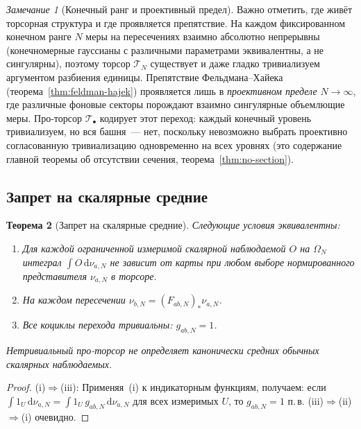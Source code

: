 \documentclass[12pt,a4paper]{article}
\theoremstyle{plain}
\newtheorem{theorem}{Теорема}[section]
\theoremstyle{definition}
\theoremstyle{remark}
\newtheorem{remark}[theorem]{Замечание}
\newcommand{\dd}{\mathrm{d}}
\begin{document}
\begin{remark}[Конечный ранг и проективный предел]
\label{rem:finite-vs-limit}
Важно отметить, где живёт торсорная структура и где
проявляется препятствие.  На каждом фиксированном конечном
ранге $N$ меры на пересечениях взаимно абсолютно непрерывны
(конечномерные гауссианы с различными параметрами
эквивалентны, а не сингулярны), поэтому торсор $\mathcal{T}_N$
существует и даже гладко тривиализуем аргументом разбиения
единицы.  Препятствие Фельдмана--Хайека
(теорема~\ref{thm:feldman-hajek}) проявляется лишь
в \emph{проективном пределе} $N \to \infty$, где различные
фоновые секторы порождают взаимно сингулярные объемлющие
меры.  Про-торсор $\mathcal{T}_\bullet$ кодирует этот
переход: каждый конечный уровень тривиализуем, но вся башня~---
нет, поскольку невозможно выбрать проективно согласованную
тривиализацию одновременно на всех уровнях (это содержание
главной теоремы об отсутствии сечения, теорема~\ref{thm:no-section}).
\end{remark}

\subsection{Запрет на скалярные средние}

\begin{theorem}[Запрет на скалярные средние]
\label{thm:scalar-nogo}
Следующие условия эквивалентны:
\begin{enumerate}[label=\textup{(\roman*)},leftmargin=2.5em]
  \item Для каждой ограниченной измеримой скалярной наблюдаемой $O$
    на $\Omega_N$ интеграл $\int O\,\dd\nu_{a,N}$ не зависит от карты
    при любом выборе нормированного представителя $\nu_{a,N}$
    в торсоре.
  \item На каждом пересечении $\nu_{b,N} = (F_{ab,N})_*\nu_{a,N}$.
  \item Все коциклы перехода тривиальны: $g_{ab,N} = 1$.
\end{enumerate}
Нетривиальный про-торсор не определяет канонически средних
обычных скалярных наблюдаемых.
\end{theorem}

\begin{proof}
(i)$\Rightarrow$(iii): Применяя~(i) к индикаторным функциям, получаем:
если $\int 1_U\,\dd\nu_{a,N} = \int 1_U\,g_{ab,N}\,\dd\nu_{a,N}$ для
всех измеримых $U$, то $g_{ab,N} = 1$ п.\,в.
(iii)$\Rightarrow$(ii)$\Rightarrow$(i) очевидно.
\end{proof}
\end{document}
